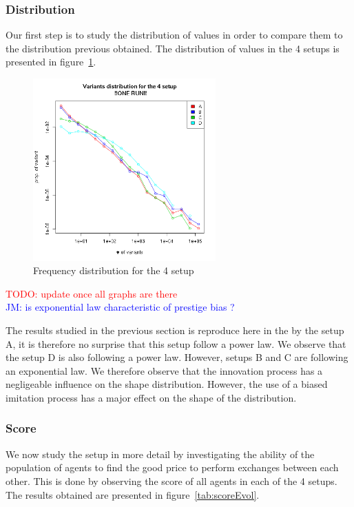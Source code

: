 \documentclass{wscpaperproc}
\newcommand{\memo}[2]{\textcolor{#1}{#2}}
\newcommand{\todo}[1]{\memo{red}{TODO: #1\\}}
\newcommand{\jm}[1]{\memo{blue}{JM: #1\\}}
\begin{document}
\subsubsection{Distribution}


Our first step is to study the distribution of values in order to compare them to the distribution previous obtained. The distribution of values in the 4 setups is presented in figure~\ref{fig:4setDi}. 

\begin{figure}[H]
	\begin{center}
		\includegraphics[width=7cm]{img/4SetupDistrib.png}
	\end{center}
	\caption{Frequency distribution for the 4 setup}
	\label{fig:4setDi}
\end{figure}

\todo{update once all graphs are there}
\jm{is exponential law characteristic of prestige bias ?}

The results studied in the previous section is reproduce here in the by the setup A, it is therefore no surprise that this setup follow a power law. We observe that the setup D is also following a power law. However, setups B and C are following an exponential law. We therefore observe that the innovation process has a negligeable influence on the shape distribution. However, the use of a biased imitation process has a major effect on the shape of the distribution.



\subsubsection{Score}

We now study the setup in more detail by investigating the ability of the population of agents to find the good price to perform exchanges between each other. This is done by observing the score of all agents in each of the 4 setups. The results obtained are presented in figure~\ref{tab:scoreEvol}.
\end{document}
